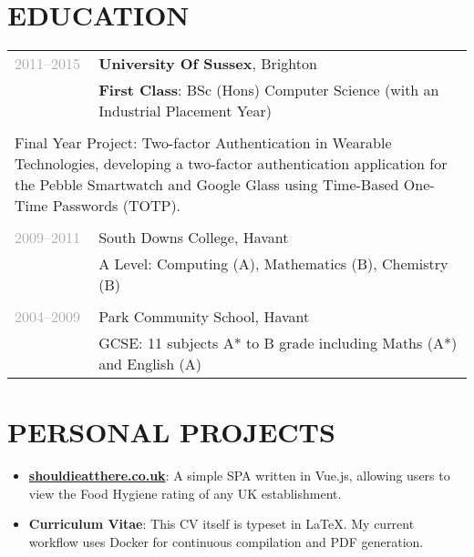 \documentclass{article}
\newenvironment{exptable}{
  \begin{longtable}{lp{0.8\textwidth}}
  }{
  \end{longtable}
}
\begin{document}
  \section*{EDUCATION}
    \begin{exptable}
      \textcolor{darkgray}{2011--2015} & {\bf University Of Sussex}, Brighton \\
                 & {\bf First Class}: BSc (Hons) Computer Science (with an Industrial Placement Year) \\
                 & \\
      \multicolumn{2}{p{\textwidth}}{
      Final Year Project: Two-factor Authentication in Wearable Technologies, developing a two-factor authentication application for the Pebble Smartwatch and Google Glass using Time-Based One-Time Passwords (TOTP).
      } \\
                 & \\
      \textcolor{darkgray}{2009--2011} & South Downs College, Havant \\
                 & A Level: Computing (A), Mathematics (B), Chemistry (B) \\
                 & \\
      \textcolor{darkgray}{2004--2009} & Park Community School, Havant \\
                 & GCSE: 11 subjects A* to B grade including Maths (A*) and English (A)
    \end{exptable}

 \section*{PERSONAL PROJECTS}
 \vspace{1em}
  \begin{itemize}
    \item \href{http://shouldieatthere.co.uk}{\textbf{shouldieatthere.co.uk}}: A simple SPA written in Vue.js, allowing users to view the Food Hygiene rating of any UK establishment.
    \item \textbf{Curriculum Vitae}: This CV itself is typeset in LaTeX. My current workflow uses Docker for continuous compilation and PDF generation.
  \end{itemize}
 \vspace{1em}
\end{document}

